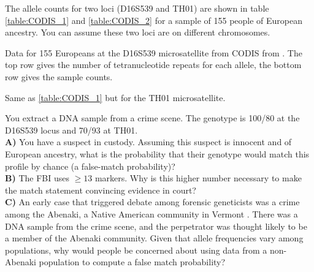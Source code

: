 {{The allele counts for two loci (D16S539
and TH01) are shown in table \ref{table:CODIS_1} and
\ref{table:CODIS_2} for a sample of 155 people of European ancestry. You can assume these two loci are on different chromosomes.

\begin{table}
{\small
\setlength{\tabcolsep}{.45\tabcolsep}
  \label{table:CODIS_1}
\caption{ Data for 155 Europeans at the D16S539 microsatellite from
  CODIS from \citet{algee:16}. The top row gives the number of
  tetranucleotide repeats for each allele, the bottom row gives the
  sample counts.}
 }

\end{table}
\vspace*{1cm}
\begin{table}
  {\small
\setlength{\tabcolsep}{.45\tabcolsep}
  \label{table:CODIS_2}
}

\caption{Same as \ref{table:CODIS_1} but for the TH01 microsatellite. }
\end{table}

\begin{question} \label{Q:CODIS}
You extract a DNA sample from a crime scene. The genotype is 100/80 at the
D16S539 locus and 70/93 at TH01.\\

{\bf A)} You have a suspect in custody. Assuming this suspect is innocent and of European ancestry, what is the probability
that their genotype would match this profile by chance (a false-match probability)?\\
{\bf B)} The FBI uses $\geq 13$ markers. Why is this higher number
necessary to make the match statement convincing evidence in court?\\
{\bf C)}  An early case that triggered debate among forensic geneticists was a crime among the Abenaki, a Native American community in
Vermont \citep[see ][ for discussion]{lewontin:94}. There was a DNA sample from the crime scene, and the
perpetrator was thought likely to be a member of the Abenaki
community. Given that allele frequencies vary among populations, why would people be concerned about using data from a non-Abenaki population to compute a false match probability?
\end{question}



}}
